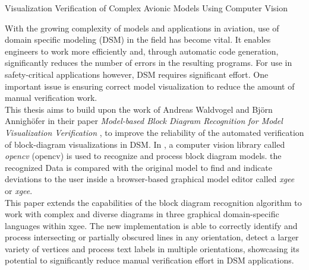 \label{abstract}
{\LARGE Visualization Verification of Complex Avionic Models Using Computer Vision}

With the growing complexity of models and applications in aviation, use of domain specific modeling (DSM) in the field has become vital. It enables engineers to work more efficiently and, through automatic code generation, significantly reduces the number of errors in the resulting programs. For use in safety-critical applications however, DSM requires significant effort. One important issue is ensuring correct model visualization to reduce the amount of manual verification work.\\
This thesis aims to build upon the work of Andreas Waldvogel and Bj{\"o}rn Annigh{\"o}fer in their paper \textit{Model-based Block Diagram Recognition for Model Visualization Verification} \cite{waldvogel_annighoefer_models_2024}, to improve the reliability of the automated verification of block-diagram visualizations in DSM. In \cite{waldvogel_annighoefer_models_2024}, a computer vision library called \textit{\acrlong{opencv}} (\acrshort{opencv}) is used to recognize and process block diagram models. the recognized Data is compared with the original model to find and indicate deviations to the user inside a browser-based graphical model editor called \textit{\acrshort{xgee}} or \textit{\acrshort{xgee}}.\\
This paper extends the capabilities of the block diagram recognition algorithm to work with complex and diverse diagrams in three graphical domain-specific languages within \acrshort{xgee}. The new implementation is able to correctly identify and process intersecting or partially obscured lines in any orientation, detect a larger variety of vertices and process text labels in multiple orientations, showcasing its potential to significantly reduce manual verification effort in DSM applications.